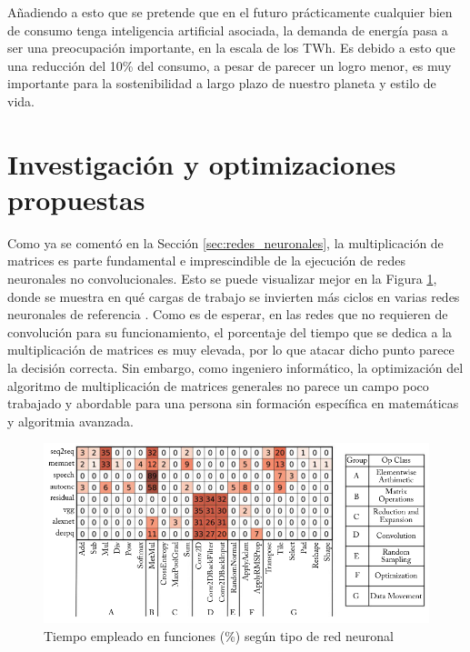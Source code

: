 Añadiendo a esto que se pretende que en el futuro prácticamente cualquier bien de consumo tenga inteligencia artificial asociada, la demanda de energía pasa a ser una preocupación importante, en la escala de los TWh. Es debido a esto que una reducción del 10\% del consumo, a pesar de parecer un logro menor, es muy importante para la sostenibilidad a largo plazo de nuestro planeta y estilo de vida.

\section{Investigación y optimizaciones propuestas}
\label{sec:investigacion_optimizaciones_propuestas}
Como ya se comentó en la Sección \ref{sec:redes_neuronales}, la multiplicación de matrices es parte fundamental e imprescindible de la ejecución de redes neuronales no convolucionales. Esto se puede visualizar mejor en la Figura \ref{fig:profiling_several_nns}, donde se muestra en qué cargas de trabajo se invierten más ciclos en varias redes neuronales de referencia \cite[Figura 3.4]{deep_learning_for_computer_architects}. Como es de esperar, en las redes que no requieren de convolución para su funcionamiento, el porcentaje del tiempo que se dedica a la multiplicación de matrices es muy elevada, por lo que atacar dicho punto parece la decisión correcta. Sin embargo, como ingeniero informático, la optimización del algoritmo de multiplicación de matrices generales no parece un campo poco trabajado y abordable para una persona sin formación específica en matemáticas y algoritmia avanzada.

\begin{figure}[h!]
    \centering
    \includegraphics[width=\textwidth]{pdf_tex/dlfca_figure3_4.pdf}
    \caption{Tiempo empleado en funciones (\%) según tipo de red neuronal}
    \label{fig:profiling_several_nns}
\end{figure}

